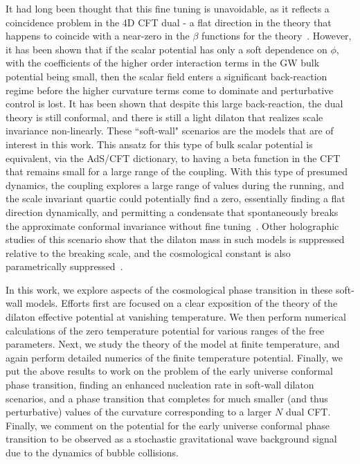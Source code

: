 \documentclass[12pt]{article}
\begin{document}
It had long been thought that this fine tuning is unavoidable, as it reflects a coincidence problem in the 4D CFT dual - a flat direction in the theory that happens to coincide with a near-zero in the $\beta$ functions for the theory~\cite{Holdom,Kutasov:2011fr,Bellazzini:2012vz}.  However, it has been shown that if the scalar potential has only a soft dependence on $\phi$, with the coefficients of the higher order interaction terms in the GW bulk potential being small, then the scalar field enters a significant back-reaction regime before the higher curvature terms come to dominate and perturbative control is lost.  It has been shown that despite this large back-reaction, the dual theory is still conformal, and there is still a light dilaton that realizes scale invariance non-linearly.  These ``soft-wall" scenarios are the models that are of interest in this work.  This ansatz for this type of bulk scalar potential is equivalent, via the AdS/CFT dictionary, to having a beta function in the CFT that remains small for a large range of the coupling.  With this type of presumed dynamics, the coupling explores a large range of values during the running, and the scale invariant quartic could potentially find a zero, essentially finding a flat direction dynamically, and permitting a condensate that spontaneously breaks the approximate conformal invariance without fine tuning~\cite{CPR,Bellazzini:2013fga,Coradeschi:2013gda}.  Other holographic studies of this scenario show that the dilaton mass in such models is suppressed relative to the breaking scale, and the cosmological constant is also parametrically suppressed~\cite{Chacko:2012sy,Chacko:2013dra,Megias:2014iwa,Cox:2014zea}. 

In this work, we explore aspects of the cosmological phase transition in these soft-wall models.  Efforts first are focused on a clear exposition of the theory of the dilaton effective potential at vanishing temperature.  We then perform numerical calculations of the zero temperature potential for various ranges of the free parameters.  Next, we study the theory of the model at finite temperature, and again perform detailed numerics of the finite temperature potential.  Finally, we put the above results to work on the problem of the early universe conformal phase transition, finding an enhanced nucleation rate in soft-wall dilaton scenarios, and a phase transition that completes for much smaller (and thus perturbative) values of the curvature corresponding to a larger $N$ dual CFT.  Finally, we comment on the potential for the early universe conformal phase transition to be observed as a stochastic gravitational wave background signal due to the dynamics of bubble collisions.
\end{document}
